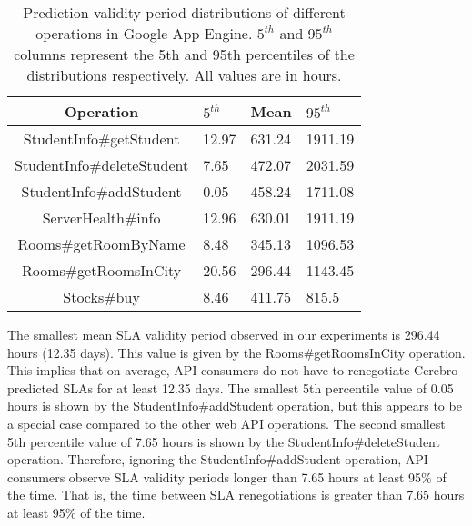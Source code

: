 \begin{table}
\begin{center}
\begin{tabular}{|c|p{1cm}|p{1cm}|p{1cm}|}
\hline
Operation & $5^{th}$ & Mean & $95^{th}$ \\ \hline
StudentInfo\#getStudent & 12.97 & 631.24 & 1911.19 \\ \hline
StudentInfo\#deleteStudent & 7.65 & 472.07 & 2031.59 \\ \hline
StudentInfo\#addStudent & 0.05 & 458.24 & 1711.08 \\ \hline
ServerHealth\#info & 12.96 & 630.01 & 1911.19 \\ \hline
Rooms\#getRoomByName & 8.48 & 345.13 & 1096.53 \\ \hline
Rooms\#getRoomsInCity & 20.56 & 296.44 & 1143.45 \\ \hline
Stocks\#buy & 8.46 & 411.75 & 815.5 \\ \hline
\end{tabular}
\end{center}
\caption{Prediction validity period distributions of different operations in
Google App Engine. $5^{th}$ and $95^{th}$ 
columns represent the 5th and 95th percentiles of the
distributions respectively. All values are in hours.
\label{tab:validity_periods}
}
\end{table}

The smallest
mean SLA validity period observed in our experiments is 296.44 hours (12.35 days). This value is given by the
Rooms\#getRoomsInCity operation. 
This implies that on average, API consumers do not have to renegotiate Cerebro-predicted SLAs
for at least 12.35 days.
The smallest 5th percentile value of 0.05 hours is shown by
the StudentInfo\#addStudent operation, but this appears to be a special case compared to the other web API
operations. The second smallest 5th percentile value of 7.65 hours is shown by the 
StudentInfo\#deleteStudent operation. Therefore, ignoring the StudentInfo\#addStudent operation, API
consumers observe SLA validity periods longer than 7.65 hours at least 95\% of the time. That is, the time
between SLA renegotiations is greater than 7.65 hours at least 95\% of the time.

